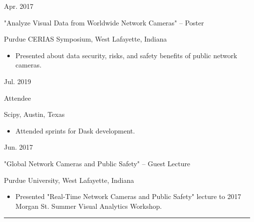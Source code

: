 \documentclass[10pt]{article}
\newlength{\cvcolumngapwidth}
\newlength{\cvleftcolumnwidth}
\newlength{\cvrightcolumnwidth}
\newcommand{\cvsectionstyle}[1]{{\normalsize\cvsectionfont\textcolor{cvsectioncolor}{#1}}}
\newcommand{\cvtitlestyle}[1]{{\large\cvtitlefont\textcolor{cvtitlecolor}{#1}}}
\newcommand{\cvdurationstyle}[1]{{\small\cvdurationfont\textcolor{cvdurationcolor}{#1}}}
\newlength{\cvafteritemskipamount}
\newlength{\cvaftersectionskipamount}
\newlength{\cvparskip}
\newcommand{\cvsection}[1]{
    \begin{minipage}[t]{\cvleftcolumnwidth}
        \raggedleft\cvsectionstyle{#1}
    \end{minipage}%
    \hspace{\cvcolumngapwidth}%
    \begin{minipage}[t]{\cvrightcolumnwidth}
        \textcolor{cvrulecolor}{\rule{\cvrightcolumnwidth}{0.3mm}}
    \end{minipage}

    \vspace{\cvaftersectionskipamount}
}
\newcommand{\cvitem}[2]{
    \begin{minipage}[t]{\cvleftcolumnwidth}
        \raggedleft #1
    \end{minipage}%
    \hspace{\cvcolumngapwidth}%
    \begin{minipage}[t]{\cvrightcolumnwidth}
        \setlength{\parskip}{\cvparskip} #2
    \end{minipage}

    \vspace{\cvafteritemskipamount}
}
\newcommand{\cvtitle}[1]{
    \cvtitlestyle{#1}

    \vspace{1mm plus 0.25mm minus 0.25mm}
    \vspace{-\cvparskip}
}
\begin{document}
\cvitem{
    \cvdurationstyle{Apr. 2017}
}{
    \cvtitle{"Analyze Visual Data from Worldwide Network Cameras" – Poster}
    
    Purdue CERIAS Symposium, West Lafayette, Indiana

    \begin{itemize}[leftmargin=*]
        \item Presented about data security, risks, and safety benefits of public network cameras.
    \end{itemize}
}


\cvitem{
    \cvdurationstyle{Jul. 2019}
}{
    \cvtitle{Attendee}
    
    Scipy, Austin, Texas

    \begin{itemize}[leftmargin=*]
        \item Attended sprints for Dask development.
    \end{itemize}
}

    


\cvitem{
    \cvdurationstyle{Jun. 2017}
}{
    \cvtitle{"Global Network Cameras and Public Safety" – Guest Lecture}
    
    Purdue University, West Lafayette, Indiana

    \begin{itemize}[leftmargin=*]
        \item Presented "Real-Time Network Cameras and Public Safety" lecture to 2017 Morgan St. Summer Visual Analytics Workshop.
    \end{itemize}
}

\cvsection{FRATERNITY LEADERSHIP}
\end{document}
